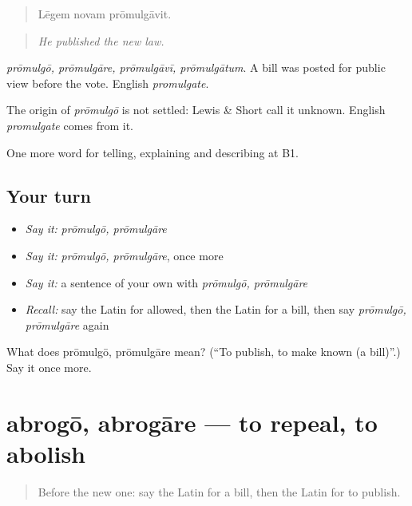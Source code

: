 \begin{quote}
Lēgem novam prōmulgāvit.
\end{quote}

\begin{quote}
\emph{He published the new law.}
\end{quote}

\emph{prōmulgō, prōmulgāre, prōmulgāvī, prōmulgātum}. A bill was posted for public view before the vote. English \emph{promulgate}.

\begin{cousinweb}
The origin of \emph{prōmulgō} is not settled: Lewis \& Short call it unknown. English \emph{promulgate} comes from it.
\end{cousinweb}

\begin{grammarlens}[title={What you've built}]
One more word for telling, explaining and describing at B1.
\end{grammarlens}

\subsection*{Your turn}
\begin{itemize}
\raggedright
  \item \emph{Say it:} \emph{prōmulgō, prōmulgāre}
  \item \emph{Say it:} \emph{prōmulgō, prōmulgāre}, once more
  \item \emph{Say it:} a sentence of your own with \emph{prōmulgō, prōmulgāre}
  \item \emph{Recall:} say the Latin for allowed, then the Latin for a bill, then say \emph{prōmulgō, prōmulgāre} again
\end{itemize}

\begin{tcolorbox}[breakable,colback=teal!4,colframe=teal!35!black,title={Before you move on}]
What does prōmulgō, prōmulgāre mean? (\textquotedblleft{}To publish, to make known (a bill)\textquotedblright{}.) Say it once more.
\end{tcolorbox}
\section[abrogō, abrogāre]{abrogō, abrogāre — to repeal, to abolish}

\label{lesson:LA-C410-abrogo}



\begin{quote}
Before the new one: say the Latin for a bill, then the Latin for to publish.
\end{quote}


